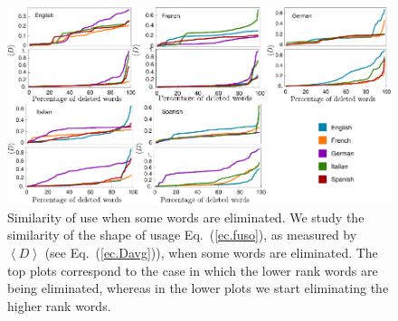 \documentclass[10pt,letterpaper]{article} %
\newcommand{\eref}[1]{Eq.~(\ref{#1})}
\begin{document}
\begin{figure}[!h]
	\begin{adjustwidth}{-2.5cm}{1cm}
		\centering
		\includegraphics{images/dsFinal}
		\caption{{Similarity of use when some words are eliminated.}
We study the similarity of the shape of usage \eref{ec.fuso}, as measured by
$\left\langle D \right\rangle $ (see \eref{ec.Davg}), when some words are eliminated.
The top plots correspond to the case in which the lower rank words are being
eliminated, whereas in the lower plots we start eliminating the higher rank
words. 
}
		\label{fig.RP}
	\end{adjustwidth}
\end{figure}


% 
\end{document}
